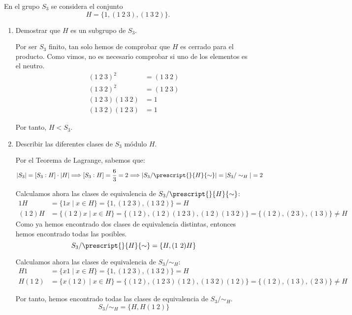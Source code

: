 \begin{ejercicio}\label{ej:3.8}
    En el grupo $S_3$ se considera el conjunto
    \[
        H = \{1, (1\ 2\ 3), (1\ 3\ 2)\}.
    \]
    \begin{enumerate}
        \item Demostrar que $H$ es un subgrupo de $S_3$.
        
        Por ser $S_3$ finito, tan solo hemos de comprobar que $H$ es cerrado para el producto. Como vimos, no es necesario comprobar si uno de los elementos es el neutro.
        \begin{align*}
            (1\ 2\ 3)^2&=(1\ 3\ 2)\\
            (1\ 3\ 2)^2&=(1\ 2\ 3)\\
            (1\ 2\ 3)(1\ 3\ 2)&=1\\
            (1\ 3\ 2)(1\ 2\ 3)&=1
        \end{align*}

        Por tanto, $H< S_3$.
        \item Describir las diferentes clases de $S_3$ módulo $H$.
        
        Por el Teorema de Lagrange, sabemos que:
        \begin{equation*}
            |S_3|=[S_3:H]\cdot |H|\Longrightarrow [S_3:H]=\dfrac{6}{3}=2\Longrightarrow |S_3/\prescript{}{H}{\sim}| = |S_3/\sim_H|=2
        \end{equation*}

        Calculamos ahora las clases de equivalencia de $S_3/\prescript{}{H}{\sim}$:
        \begin{align*}
            1H &= \{1x\mid x\in H\} = \{1, (1\ 2\ 3), (1\ 3\ 2)\} = H\\
            (1\ 2)H &= \{(1\ 2)x\mid x\in H\} = \{(1\ 2), (1\ 2)(1\ 2\ 3), (1\ 2)(1\ 3\ 2)\} = \{(1\ 2), (2\ 3), (1\ 3)\}\neq H
        \end{align*}
        Como ya hemos encontrado dos clases de equivalencia distintas, entonces hemos encontrado todas las posibles.
        \begin{equation*}
            S_3/\prescript{}{H}{\sim} = \{H, (1\ 2)H\}
        \end{equation*}

        Calculamos ahora las clases de equivalencia de $S_3/\sim_H$:
        \begin{align*}
            H1 &= \{x1\mid x\in H\} = \{1, (1\ 2\ 3), (1\ 3\ 2)\} = H\\
            H(1\ 2) &= \{x(1\ 2)\mid x\in H\} = \{(1\ 2), (1\ 2\ 3)(1\ 2), (1\ 3\ 2)(1\ 2)\} = \{(1\ 2), (1\ 3), (2\ 3)\}\neq H
        \end{align*}

        Por tanto, hemos encontrado todas las clases de equivalencia de $S_3/\sim_H$.
        \begin{equation*}
            S_3/\sim_H = \{H, H(1\ 2)\}
        \end{equation*}
    \end{enumerate}
\end{ejercicio}

